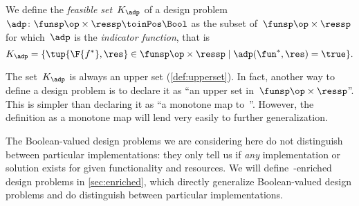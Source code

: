 \begin{definition}
  \label{def:dp-feasible-set}
  We define the \emph{feasible set}~$K_\adp$ of a design problem~$\adp\colon \funsp\op \times \ressp\toinPos \Bool$ as the subset of~$\funsp \op\times \ressp$ for which~$\adp$ is the \emph{indicator function}, that is%
  \begin{equation*}
    K_\adp = \{ \tup{\F{f^*},\res} \in \funsp \op\times \ressp  \mid %
    \adp(\fun^*, \res) = \true %
    \}.
  \end{equation*}
\end{definition}
\begin{remark}
  The set~$K_\adp$ is always an upper set (\cref{def:upperset}).
  In fact, another way to define a design problem is to declare it as ``an upper set in~$\funsp\op \times \ressp$''. This is simpler than declaring it as ``a monotone map to~\Bool''.
  However, the definition as a monotone map will lend very easily to further generalization.
\end{remark}
The Boolean-valued design problems we are considering here do not distinguish between particular implementations: they only tell us if \emph{any} implementation or solution exists for given functionality and resources. We will define~\Set-enriched design problems in \cref{sec:enriched}, which directly generalize Boolean-valued design problems and do distinguish between particular implementations.

